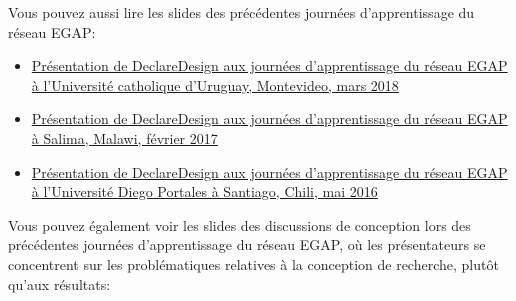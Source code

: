 \documentclass[
  12pt,
]{book}
\begin{document}
Vous pouvez aussi lire les slides des précédentes journées d'apprentissage du réseau EGAP:

\begin{itemize}
\item
  \href{https://egap.github.io/learningdays-resources/Slides/Examples/declare_design-montevideo.pdf}{Présentation de DeclareDesign aux journées d'apprentissage du réseau EGAP à l'Université catholique d'Uruguay, Montevideo, mars 2018}
\item
  \href{https://egap.github.io/learningdays-resources/Slides/Examples/declare_design-malawi.pdf}{Présentation de DeclareDesign aux journées d'apprentissage du réseau EGAP à Salima, Malawi, février 2017}
\item
  \href{https://egap.github.io/learningdays-resources/Slides/Examples/declare_design-santiago.pdf}{Présentation de DeclareDesign aux journées d'apprentissage du réseau EGAP à l'Université Diego Portales à Santiago, Chili, mai 2016}
\end{itemize}

Vous pouvez également voir les slides des discussions de conception lors des précédentes journées d'apprentissage du réseau EGAP, où les présentateurs se concentrent sur les problématiques relatives à la conception de recherche, plutôt qu'aux résultats:
\end{document}
